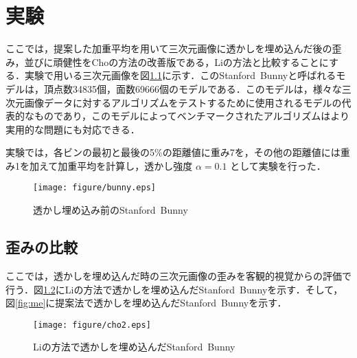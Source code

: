 \documentclass[11pt]{jreport}
\begin{document}
{\chapter{実験}
ここでは，提案した加重平均を用いて三次元画像に透かしを埋め込んだ後の歪み，並びに頑健性をChoの方法の改善版である，Liの方法と比較することにする．実験で用いる三次元画像を図\ref{fig:bunny}に示す．このStanford\ Bunnyと呼ばれるモデルは，頂点数34835個，面数69666個のモデルである．このモデルは，様々な三次元画像データに対するアルゴリズムをテストするために使用されるモデルの代表的なものであり，このモデルによってベンチマークされたアルゴリズムはより実用的な問題にも対応できる．\par
実験では，各ビンの最初と最後の5\%の距離値に重み7を，その他の距離値には重み1を加えて加重平均を計算し，透かし強度
\begin{math}
\alpha=0.1
\end{math}
として実験を行った．
\begin{figure}[htbp]
  \begin{center}
    \texttt{[image: figure/bunny.eps]}%
  \end{center}
  \caption{透かし埋め込み前のStanford\ Bunny}
  \label{fig:bunny}
\end{figure}



\newpage






\section{歪みの比較}
ここでは，透かしを埋め込んだ時の三次元画像の歪みを客観的視覚からの評価で行う．図\ref{fig:Li_bunny}にLiの方法で透かしを埋め込んだStanford\ Bunnyを示す．そして，図\ref{fig:me}に提案法で透かしを埋め込んだStanford\ Bunnyを示す．
\begin{figure}[htbp]
  \begin{center}
    \texttt{[image: figure/cho2.eps]}%
  \end{center}
  \caption{Liの方法で透かしを埋め込んだStanford\ Bunny}
  \label{fig:Li_bunny}
\end{figure}

}
\end{document}
